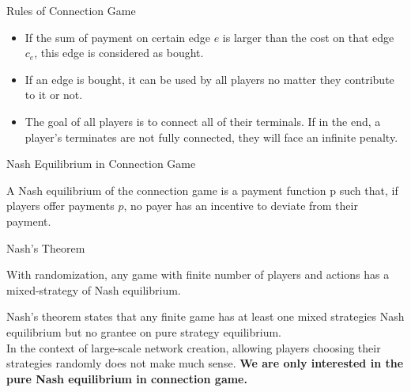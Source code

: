 \documentclass[11pt,aspectratio=169]{beamer}
\begin{document}
\begin{frame}{Rules of Connection Game}
\begin{definition}
    \begin{itemize}
    \item If the sum of payment on certain edge \(e\) is larger than the cost on that edge \(c_e\), this edge is considered as bought.
    \item If an edge is bought, it can be used by all players no matter they contribute to it or not. \\
    \item The goal of all players is to connect all of their terminals. If in the end, a player's terminates are not fully connected, they will face an infinite penalty.  
    \end{itemize}
    \end{definition}
\end{frame}

\begin{frame}{Nash Equilibrium in Connection Game}
     \begin{definition}
        A Nash equilibrium of the connection game is a payment function p such that, if players offer payments \(p\), no payer has an incentive to deviate from their payment. 
    \end{definition}
\end{frame}

\begin{frame}{Nash's Theorem}
    \begin{theorem}
        With randomization, any game with finite number of players and actions has a mixed-strategy of Nash equilibrium.
    \end{theorem}
    Nash's theorem states that any finite game has at least one mixed strategies Nash equilibrium but no grantee on pure strategy equilibrium.\\ 
    \vspace{10pt}
    In the context of large-scale network creation, allowing players choosing their strategies randomly does not make much sense. \textbf{We are only interested in the pure Nash equilibrium in connection game.}
\end{frame}
\end{document}
